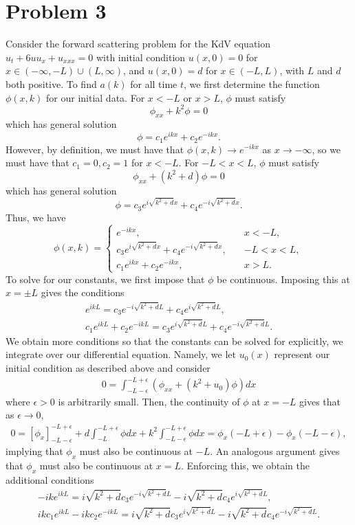 \documentclass{article}
\begin{document}
\section{Problem 3}
Consider the forward scattering problem for the KdV equation $u_t+6uu_x+u_{xxx}=0$ with initial condition
$u(x,0)=0$ for $x\in (-\infty,-L)\cup(L,\infty)$, and $u(x,0)=d$ for
$x\in(-L,L)$, with $L$ and $d$ both positive. To find $a(k)$ for all time $t$, we first determine the function $\phi(x,k)$ for our initial data. For $x<-L$ or $x>L$, $\phi$ must satisfy 
\[
\phi_{xx}+k^2\phi=0
\]
which has general solution 
\[
\phi=c_1e^{ikx}+c_2e^{-ikx}.
\]
However, by definition, we must have that $\phi(x,k)\to e^{-ikx}$ as $x\to-\infty$, so we must have that $c_1=0,c_2=1$ for $x<-L$. For $-L<x<L$, 
$\phi$ must satisfy 
\[
\phi_{xx}+(k^2+d)\phi=0
\]
which has general solution
\[
\phi=c_3e^{i\sqrt{k^2+d}x}+c_4e^{-i\sqrt{k^2+d}x}.
\]
Thus, we have
\[
\phi(x,k)=\begin{cases}
	e^{-ikx},\quad&x<-L,\\
	c_3e^{i\sqrt{k^2+d}x}+c_4e^{-i\sqrt{k^2+d}x},\quad&-L<x<L,\\
	c_1e^{ikx}+c_2e^{-ikx}, \quad&x>L.
\end{cases}
\]
To solve for our constants, we first impose that $\phi$ be continuous. Imposing this at $x=\pm L$ gives the conditions
\begin{align*}
e^{ikL}=c_3e^{-i\sqrt{k^2+d}L}+c_4e^{i\sqrt{k^2+d}L},\\
c_1e^{ikL}+c_2e^{-ikL}=c_3e^{i\sqrt{k^2+d}L}+c_4e^{-i\sqrt{k^2+d}L}.
\end{align*}
We obtain more conditions so that the constants can be solved for explicitly, we integrate over our differential equation. Namely, we let $u_0(x)$ represent our initial condition as described above and consider 
\begin{align*}
0=\int_{-L-\epsilon}^{-L+\epsilon}(\phi_{xx}+(k^2+u_0)\phi)dx
\end{align*}
where $\epsilon>0$ is arbitrarily small. Then, the continuity of $\phi$ at $x=-L$ gives that as $\epsilon\to0$,
\begin{align*}
0=\left[\phi_x\right]_{-L-\epsilon}^{-L+\epsilon}+d\int_{-L}^{-L+\epsilon}\phi dx+k^2\int_{-L-\epsilon}^{-L+\epsilon}\phi dx=\phi_x(-L+\epsilon)-\phi_x(-L-\epsilon),
\end{align*}
implying that $\phi_x$ must also be continuous at $-L$. An analogous argument gives that $\phi_x$ must also be continuous at $x=L$. Enforcing this, we obtain the additional conditions
\begin{align*}
	-ike^{ikL}=i\sqrt{k^2+d}c_3e^{-i\sqrt{k^2+d}L}-i\sqrt{k^2+d}c_4e^{i\sqrt{k^2+d}L},\\
	ikc_1e^{ikL}-ikc_2e^{-ikL}=i\sqrt{k^2+d}c_3e^{i\sqrt{k^2+d}L}-i\sqrt{k^2+d}c_4e^{-i\sqrt{k^2+d}L}.
\end{align*}
\end{document}
